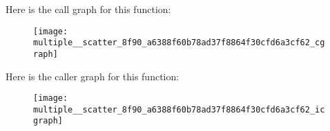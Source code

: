 Here is the call graph for this function\+:
\nopagebreak
\begin{figure}[H]
\begin{center}
\leavevmode
\texttt{[image: multiple\_\_scatter\_8f90\_a6388f60b78ad37f8864f30cfd6a3cf62\_cgraph]}
\end{center}
\end{figure}
Here is the caller graph for this function\+:
\nopagebreak
\begin{figure}[H]
\begin{center}
\leavevmode
\texttt{[image: multiple\_\_scatter\_8f90\_a6388f60b78ad37f8864f30cfd6a3cf62\_icgraph]}
\end{center}
\end{figure}
